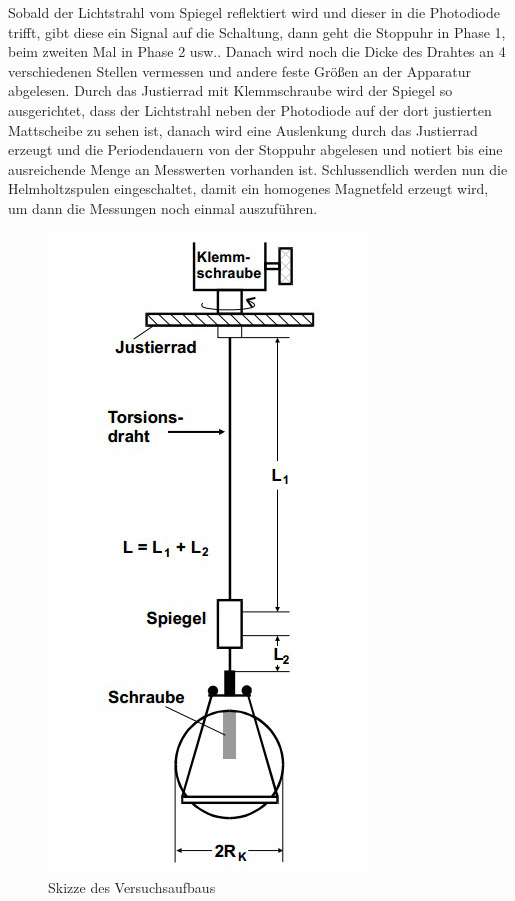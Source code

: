    
    Sobald der Lichtstrahl vom Spiegel reflektiert wird und dieser in die Photodiode trifft, gibt 
    diese ein Signal auf die Schaltung, dann geht die Stoppuhr in Phase 1, beim zweiten Mal in 
    Phase 2 usw..
    Danach wird noch die Dicke des Drahtes an 4 verschiedenen Stellen vermessen und 
    andere feste Größen an der Apparatur abgelesen.
    Durch das Justierrad mit Klemmschraube wird der Spiegel so ausgerichtet, dass der 
    Lichtstrahl neben der Photodiode auf der dort justierten Mattscheibe zu sehen ist, danach wird 
    eine Auslenkung durch das Justierrad erzeugt und die Periodendauern von der Stoppuhr abgelesen und notiert bis 
    eine ausreichende Menge an Messwerten vorhanden ist.  
    Schlussendlich werden nun die Helmholtzspulen eingeschaltet, damit ein homogenes 
    Magnetfeld erzeugt wird, um dann die Messungen noch einmal auszuführen.
    \begin{figure}[b]
      \centering
      \includegraphics*[scale = 0.75]{Grafik/Versuchsaufbau.jpg}%
      \caption{Skizze des Versuchsaufbaus}
      \label{Aufbau}%
    \end{figure}
   
